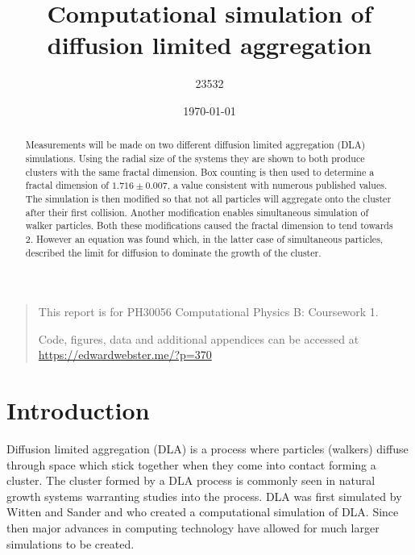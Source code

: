 \documentclass[%
 aapm,
 mph,%
 amsmath,amssymb,
 reprint,%
]{revtex4-2}
\begin{document}

\title[DLA Computational Simulation]{Computational simulation of diffusion limited aggregation}%

\author{23532}
%

\date{\today}%

\begin{abstract}
Measurements will be made on two different diffusion limited aggregation (DLA) simulations. Using the radial size of the systems they are shown to both produce clusters with the same fractal dimension. Box counting is then used to determine a fractal dimension of $1.716\pm0.007$, a value consistent with numerous published values. The simulation is then modified so that not all particles will aggregate onto the cluster after their first collision. Another modification enables simultaneous simulation of walker particles. Both these modifications caused the fractal dimension to tend towards 2. However an equation was found which, in the latter case of simultaneous particles, described the limit for diffusion to dominate the growth of the cluster.
%
\end{abstract}
\maketitle

\begin{quotation}
This report is for PH30056 Computational Physics B: Coursework 1.

Code, figures, data and additional appendices can be accessed at \url{https://edwardwebster.me/?p=370}
\end{quotation}

\section{\label{sec:introduction}Introduction}
Diffusion limited aggregation (DLA) is a process where particles (walkers) diffuse through space which stick together when they come into contact \cite{dictionary} forming a cluster. The cluster formed by a DLA process is commonly seen in natural growth systems\cite{MeakinDLA} warranting studies into the process. DLA was first simulated by Witten and Sander\cite{WittenDLA} and who created a computational simulation of DLA. Since then major advances in computing technology have allowed for much larger simulations to be created.
\end{document}
